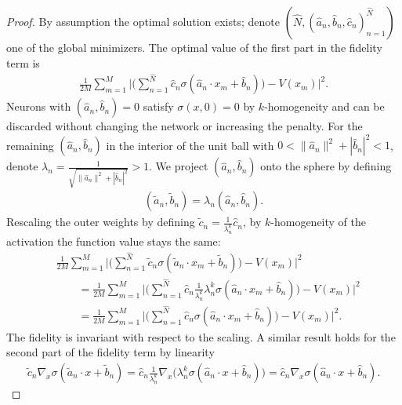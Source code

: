 \documentclass[11pt]{amsart}
\theoremstyle{definition}
\theoremstyle{remark}
\begin{document}
\begin{proof}
    By assumption the optimal solution exists; denote $(\hat{N}, (\hat{a}_n, \hat{b}_n, \hat{c}_n)_{n = 1}^{\hat{N}})$ one of the global minimizers. The optimal value of the first part in the fidelity term is
	\begin{align*}
		 \frac{1}{2M} \sum_{m = 1}^M \bigg|\bigg( \sum_{n = 1}^{\hat{N}} \hat{c}_n \sigma(\hat{a}_n \cdot x_m + \hat{b}_n) \bigg) - V(x_m) \bigg|^2.
	\end{align*}
    Neurons with $(\hat{a}_n, \hat{b}_n) = 0$ satisfy $\sigma(x, 0) = 0$ by $k$-homogeneity and can be discarded without changing the network or increasing the penalty. For the remaining $(\hat{a}_n, \hat{b}_n)$ in the interior of the unit ball with $0 < \|\hat{a}_n\|^2 + |\hat{b}_n|^2 <  1$, denote $\lambda_n =\frac{1}{ \sqrt{ \|\hat{a}_n\|^2 + |\hat{b}_n|^2} } >  1$. We project $(\hat{a}_n, \hat{b}_n)$ onto the sphere by defining
        \begin{align*}
            (\tilde{a}_n,\tilde{b}_n) = \lambda_n (\hat{a}_n, \hat{b}_n).
        \end{align*}
    Rescaling the outer weights by defining $\tilde{c}_n = \frac{1}{\lambda_n^k} \hat{c}_n$, by $k$-homogeneity of the activation the function value stays the same:
	\begin{align*}
		&\frac{1}{2M} \sum_{m = 1}^M \bigg|\bigg( \sum_{n = 1}^{\hat{N}} \tilde{c}_n \sigma(\tilde{a}_n \cdot x_m + \tilde{b}_n) \bigg) - V(x_m) \bigg|^2 \\
		&\qquad= \frac{1}{2M} \sum_{m = 1}^M \bigg|\bigg(\sum_{n = 1}^{\hat{N}} \hat{c}_n \frac{1}{\lambda_n^k}  \lambda_n^k \sigma(\hat{a}_n \cdot x_m + \hat{b}_n) \bigg) - V(x_m) \bigg|^2 \\
		&\qquad= \frac{1}{2M} \sum_{m = 1}^M \bigg|\bigg( \sum_{n = 1}^{\hat{N}} \hat{c}_n \sigma(\hat{a}_n \cdot x_m + \hat{b}_n) \bigg) - V(x_m) \bigg|^2.
	\end{align*}
    The fidelity is invariant with respect to the scaling. A similar result holds for the second part of the fidelity term by linearity
	\begin{align*}
		\tilde{c}_n \nabla_x \sigma (\tilde{a}_n \cdot x + \tilde{b}_n) = \hat{c}_n \frac{1}{\lambda_n^k} \nabla_x \bigg(\lambda_n^k \sigma(\hat{a}_n \cdot x+ \hat{b}_n) \bigg) = \hat{c}_n \nabla_x \sigma(\hat{a}_n \cdot x + \hat{b}_n).
	\end{align*}


\end{proof}
\end{document}
